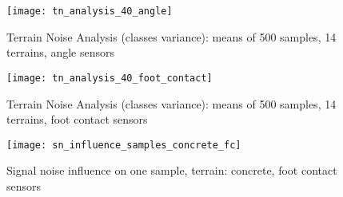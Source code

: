 \begin{figure}[H]
  \centering
  \texttt{[image: tn\_analysis\_40\_angle]}
  \caption{Terrain Noise Analysis (classes variance): means of 500 samples, 14 terrains, angle sensors}
  \label{fig:tn_analysis_angle}
\end{figure}

\begin{figure}[H]
  \centering
  \texttt{[image: tn\_analysis\_40\_foot\_contact]}
  \caption{Terrain Noise Analysis (classes variance): means of 500 samples, 14 terrains, foot contact sensors}
  \label{fig:tn_analysis_foot_contact}
\end{figure}

\begin{figure}[H]
  \centering
  \texttt{[image: sn\_influence\_samples\_concrete\_fc]}
  \caption{Signal noise influence on one sample, terrain: concrete, foot contact sensors}
  \label{fig:sn_influence_samples_concrete_fc}
\end{figure}

%
